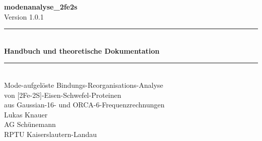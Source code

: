 \documentclass[11pt,a4paper,twoside]{article}
\theoremstyle{remark}
\begin{document}
\begin{titlepage}
  \begin{center}
    \vspace*{2cm}
    {\Huge\bfseries\color{accent} modenanalyse\_2fe2s}\\[0.4cm]
    {\large Version 1.0.1}\\[2cm]

    \rule{\textwidth}{0.4pt}\\[0.3cm]
    {\LARGE\bfseries Handbuch und theoretische Dokumentation}\\[0.3cm]
    \rule{\textwidth}{0.4pt}\\[1cm]

    {\large
      Mode-aufgel\"oste Bindungs-Reorganisations-Analyse\\
      von {[}2Fe-2S{]}-Eisen-Schwefel-Proteinen\\
      aus Gaussian-16- und ORCA-6-Frequenzrechnungen
    }\\[1.5cm]

    {\large
      Lukas Knauer\\
      AG Sch\"unemann\\
      RPTU Kaiserslautern-Landau
    }\\[1.5cm]


\end{center}
\end{titlepage}
\end{document}
